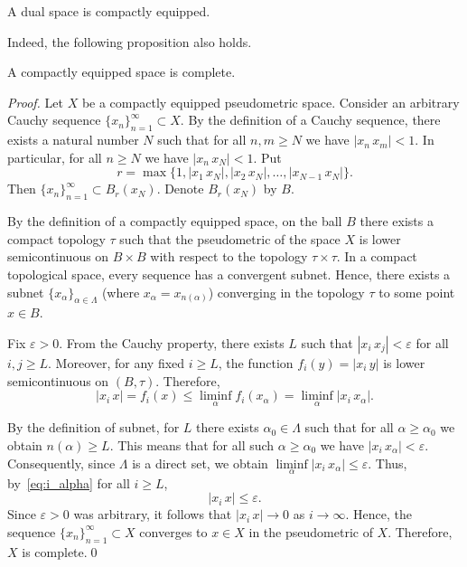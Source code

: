 \documentclass{svproc}
\begin{document}
\begin{corollary}\label{cor:dual_equip}
A dual space is compactly equipped.
\end{corollary} 

Indeed, the following proposition also holds.

\begin{proposition}\label{prop:complete}
A compactly equipped space is complete.
\end{proposition}

\begin{proof}

Let $X$ be a compactly equipped pseudometric space. Consider an arbitrary Cauchy sequence $\{x_n\}_{n=1}^{\infty}\subset X$. By the definition of a Cauchy sequence, there exists a natural number $N$ such that for all $n, m \ge N$ we have $|x_n\, x_m| < 1$. In particular, for all $n\ge N$ we have $|x_n\, x_N| < 1$. Put
$$r = \max\bigl\{1, |x_1\, x_N|, |x_2\, x_N|, \ldots, |x_{N-1}\, x_N| \bigr\}.$$
Then $\{x_n\}_{n=1}^{\infty}\subset B_r(x_N)$. Denote $B_r(x_N)$ by $B$.

By the definition of a compactly equipped space, on the ball $B$ there exists a compact topology $\tau$ such that the pseudometric of the space $X$ is lower semicontinuous on $B\times B$ with respect to the topology $\tau\times \tau$. In a compact topological space, every sequence has a convergent subnet. Hence, there exists a subnet $\{x_{\alpha}\}_{\alpha\in \Lambda}$ (where $x_{\alpha} = x_{n(\alpha)}$) converging in the topology $\tau$ to some point $x\in B$.

Fix $\varepsilon > 0$. From the Cauchy property, there exists $L$ such that $|x_i\, x_j| < \varepsilon$ for all $i, j\ge L$. Moreover, for any fixed $i\ge L$, the function $f_i(y) = |x_i\, y|$ is lower semicontinuous on $(B, \tau)$. Therefore,
\begin{equation}\label{eq:i_alpha}
|x_i\, x| = f_i(x) \le \liminf\limits_{\alpha} f_i(x_{\alpha}) = \liminf\limits_{\alpha} |x_i\, x_{\alpha}|.
\end{equation}

By the definition of subnet, for $L$ there exists $\alpha_0\in \Lambda$ such that for all $\alpha\ge \alpha_0$ we obtain $n(\alpha)\ge L$. This means that for all such $\alpha\ge \alpha_0$ we have $|x_i\, x_{\alpha}| < \varepsilon$. Consequently, since $\Lambda$ is a direct set, we obtain $\liminf\limits_{\alpha} |x_i\, x_{\alpha}|\le \varepsilon$. Thus, by~\eqref{eq:i_alpha} for all $i\ge L$,
$$|x_i\, x|\le \varepsilon.$$
Since $\varepsilon > 0$ was arbitrary, it follows that $|x_i\, x|\rightarrow 0$ as $i\rightarrow \infty$. Hence, the sequence $\{x_n\}_{n=1}^{\infty}\subset X$ converges to $x\in X$ in the pseudometric of $X$. Therefore, $X$ is complete.\qed

\end{proof}
\end{document}

